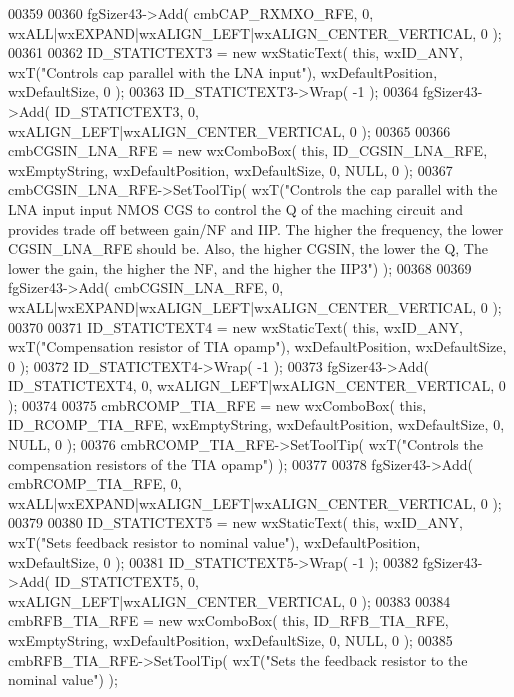 \begin{DoxyCode}
00359     
00360     fgSizer43->Add( cmbCAP_RXMXO_RFE, 0, wxALL|wxEXPAND|wxALIGN\_LEFT|wxALIGN\_CENTER\_VERTICAL, 0 );
00361     
00362     ID_STATICTEXT3 = \textcolor{keyword}{new} wxStaticText( \textcolor{keyword}{this}, wxID\_ANY, wxT(\textcolor{stringliteral}{"Controls cap parallel with the LNA input"}), 
      wxDefaultPosition, wxDefaultSize, 0 );
00363     ID_STATICTEXT3->Wrap( -1 );
00364     fgSizer43->Add( ID_STATICTEXT3, 0, wxALIGN\_LEFT|wxALIGN\_CENTER\_VERTICAL, 0 );
00365     
00366     cmbCGSIN_LNA_RFE = \textcolor{keyword}{new} wxComboBox( \textcolor{keyword}{this}, ID_CGSIN_LNA_RFE, wxEmptyString, wxDefaultPosition, 
      wxDefaultSize, 0, NULL, 0 ); 
00367     cmbCGSIN_LNA_RFE->SetToolTip( wxT(\textcolor{stringliteral}{"Controls the cap parallel with the LNA input input NMOS CGS to
       control the Q of the maching circuit and provides trade off between gain/NF and IIP. The higher the frequency,
       the lower CGSIN\_LNA\_RFE should be. Also, the higher CGSIN, the lower the Q, The lower the gain, the higher the
       NF, and the higher the IIP3"}) );
00368     
00369     fgSizer43->Add( cmbCGSIN_LNA_RFE, 0, wxALL|wxEXPAND|wxALIGN\_LEFT|wxALIGN\_CENTER\_VERTICAL, 0 );
00370     
00371     ID_STATICTEXT4 = \textcolor{keyword}{new} wxStaticText( \textcolor{keyword}{this}, wxID\_ANY, wxT(\textcolor{stringliteral}{"Compensation resistor of TIA opamp"}), 
      wxDefaultPosition, wxDefaultSize, 0 );
00372     ID_STATICTEXT4->Wrap( -1 );
00373     fgSizer43->Add( ID_STATICTEXT4, 0, wxALIGN\_LEFT|wxALIGN\_CENTER\_VERTICAL, 0 );
00374     
00375     cmbRCOMP_TIA_RFE = \textcolor{keyword}{new} wxComboBox( \textcolor{keyword}{this}, ID_RCOMP_TIA_RFE, wxEmptyString, wxDefaultPosition, 
      wxDefaultSize, 0, NULL, 0 ); 
00376     cmbRCOMP_TIA_RFE->SetToolTip( wxT(\textcolor{stringliteral}{"Controls the compensation resistors of the TIA opamp"}) );
00377     
00378     fgSizer43->Add( cmbRCOMP_TIA_RFE, 0, wxALL|wxEXPAND|wxALIGN\_LEFT|wxALIGN\_CENTER\_VERTICAL, 0 );
00379     
00380     ID_STATICTEXT5 = \textcolor{keyword}{new} wxStaticText( \textcolor{keyword}{this}, wxID\_ANY, wxT(\textcolor{stringliteral}{"Sets feedback resistor to nominal value"}), 
      wxDefaultPosition, wxDefaultSize, 0 );
00381     ID_STATICTEXT5->Wrap( -1 );
00382     fgSizer43->Add( ID_STATICTEXT5, 0, wxALIGN\_LEFT|wxALIGN\_CENTER\_VERTICAL, 0 );
00383     
00384     cmbRFB_TIA_RFE = \textcolor{keyword}{new} wxComboBox( \textcolor{keyword}{this}, ID_RFB_TIA_RFE, wxEmptyString, wxDefaultPosition, wxDefaultSize,
       0, NULL, 0 ); 
00385     cmbRFB_TIA_RFE->SetToolTip( wxT(\textcolor{stringliteral}{"Sets the feedback resistor to the nominal value"}) );

\end{DoxyCode}
